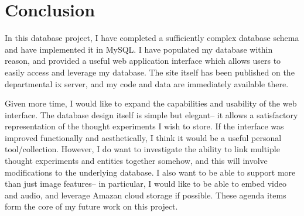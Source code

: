 \section{Conclusion}
In this database project, I have completed a sufficiently complex
database schema and have implemented it in MySQL.
I have populated my database within reason,
and provided a useful web application interface which
allows users to easily access and leverage my database.
The site itself has been published on the departmental ix server,
and my code and data are immediately available there.

Given more time, I would like to expand the capabilities and usability
of the web interface.  The database design itself is simple but elegant--
it allows a satisfactory representation of the thought experiments I wish
to store.  If the interface was improved functionally and aesthetically,
I think it would be a useful personal tool/collection.
However, I do want to investigate the ability to link multiple thought
experiments and entities together somehow, and this will involve
modifications to the underlying database.
I also want to be able to support more than just image features--
in particular, I would like to be able to embed video and audio,
and leverage Amazan cloud storage if possible.
These agenda items form the core of my future work on this project.
